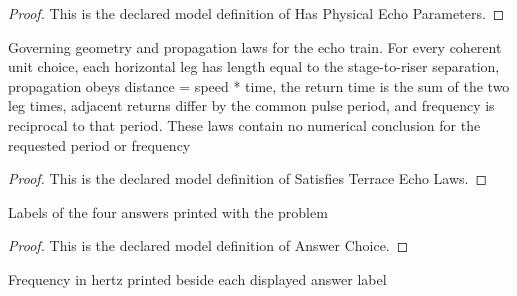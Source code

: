 \begin{proof}
  This is the declared model definition of Has Physical Echo Parameters.
\end{proof}
\begin{definition}
  \label{def:physics:phyx-mini-0310:phyxminiproblems-problemphyxmini0310-satisfiesterraceecholaws}
  Governing geometry and propagation laws for the echo train. For every coherent unit choice, each horizontal leg has length equal to the stage-to-riser separation, propagation obeys distance = speed * time, the return time is the sum of the two leg times, adjacent returns differ by the common pulse period, and frequency is reciprocal to that period. These laws contain no numerical conclusion for the requested period or frequency
\end{definition}
\begin{proof}
  This is the declared model definition of Satisfies Terrace Echo Laws.
\end{proof}
\begin{definition}
  \label{def:physics:phyx-mini-0310:phyxminiproblems-problemphyxmini0310-answerchoice}
  Labels of the four answers printed with the problem
\end{definition}
\begin{proof}
  This is the declared model definition of Answer Choice.
\end{proof}
\begin{definition}[hertz]
  \label{def:physics:phyx-mini-0310:phyxminiproblems-problemphyxmini0310-answerchoice-hertz}
  Frequency in hertz printed beside each displayed answer label
\end{definition}
